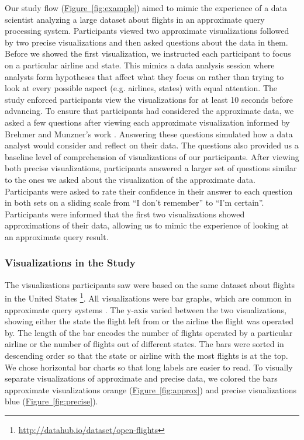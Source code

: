 \documentclass[10pt,journal,compsoc]{IEEEtran}
\newcommand{\figref}[1]{\hyperref[#1]{Figure~\ref*{#1}}}
\begin{document}
Our study flow (\figref{fig:example}) aimed to mimic the experience of a data scientist analyzing a large dataset about flights in an approximate query processing system.
Participants viewed two approximate visualizations followed by two precise visualizations and then asked questions about the data in them.
Before we showed the first visualization, we instructed each participant to focus on a particular airline and state.
This mimics a data analysis session where analysts form hypotheses that affect what they focus on rather than trying to look at every possible aspect (e.g. airlines, states) with equal attention.
The study enforced participants view the visualizations for at least 10 seconds before advancing. %
To ensure that participants had considered the approximate data, we asked a few questions after viewing each approximate visualization informed by Brehmer and Munzner's work \cite{brehmer2013multi}.
Answering these questions simulated how a data analyst would consider and reflect on their data.
The questions also provided us a baseline level of comprehension of visualizations of our participants.
After viewing both precise visualizations, participants answered a larger set of questions similar to the ones we asked about the visualization of the approximate data.
Participants were asked to rate their confidence in their answer to each question in both sets on a sliding scale from ``I don't remember'' to ``I'm certain''.
Participants were informed that the first two visualizations showed approximations of their data, allowing us to mimic the experience of looking at an approximate query result.

\subsubsection{Visualizations in the Study}\label{sec:vizes}

The visualizations participants saw were based on the same dataset about flights in the United States \footnote{\url{http://datahub.io/dataset/open-flights}}.
All visualizations were bar graphs, which are common in approximate query systems \cite{moritz2017pangloss}.
The y-axis varied between the two visualizations, showing either the state the flight left from or the airline the flight was operated by.
The length of the bar encodes the number of flights operated by a particular airline or the number of flights out of different states.
The bars were sorted in descending order so that the state or airline with the most flights is at the top.
We chose horizontal bar charts so that long labels are easier to read.
To visually separate visualizations of approximate and precise data, we colored the bars approximate visualizations orange (\figref{fig:approx}) and precise visualizations blue (\figref{fig:precise}). 
\end{document}
